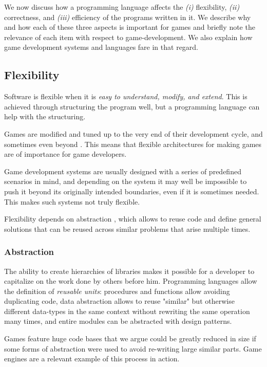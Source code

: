 We now discuss how a programming language affects the \textit{(i)} flexibility, \textit{(ii)}  correctness, and \textit{(iii)} efficiency of the programs written in it. We describe why and how each of these three aspects is important for games and briefly note the relevance of each item with respect to game-development. We also explain how game development systems and languages fare in that regard.

\subsection{Flexibility}
Software is flexible when it is \textit{easy to understand, modify, and extend}. This is achieved through structuring the program well, but a programming language can help with the structuring.

Games are modified and tuned up to the very end of their development cycle, and sometimes even beyond \cite{CHAPTER_1_PATCHING_CYCLES}. This means that flexible architectures for making games are of importance for game developers.

Game development systems are usually designed with a series of predefined scenarios in mind, and depending on the system it may well be impossible to push it beyond its originally intended boundaries, even if it is sometimes needed. This makes such systems not truly flexible.

Flexibility depends on abstraction \cite{CHAPTER_1_CODE_MANAGEMENT,CHAPTER_1_PL_INFLUENCE_ON_PL}, which allows to reuse code and define general solutions that can be reused across similar problems that arise multiple times.

\subsubsection{Abstraction}
The ability to create hierarchies of libraries makes it possible for a developer to capitalize on the work done by others before him. Programming languages allow the definition of \textit{reusable units}: procedures and functions allow avoiding duplicating code, data abstraction allows to reuse "similar" but otherwise different data-types in the same context without rewriting the same operation many times, and entire modules can be abstracted with design patterns.

Games feature huge code bases \cite{CHAPTER_1_SIZE_OF_GAMES} that we argue could be greatly reduced in size if some forms of abstraction were used to avoid re-writing large similar parts. Game engines are a relevant example of this process in action.

